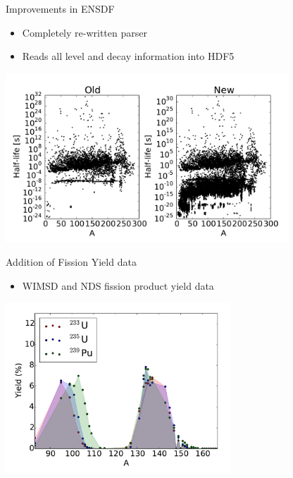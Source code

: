 \documentclass[xcolor=x11names,compress]{beamer}
\renewcommand{\(}{\begin{columns}}
\renewcommand{\)}{\end{columns}}
\newcommand{\<}[1]{\begin{column}{#1}}
\renewcommand{\>}{\end{column}}
\begin{document}
\begin{frame}{Improvements in ENSDF}
    \begin{itemize}
        \item Completely re-written parser
        \item Reads all level and decay information into HDF5
    \end{itemize}
    
        \includegraphics[height=2.5in,clip]{ensdf.pdf}  
   
\end{frame}

\begin{frame}{Addition of Fission Yield data}
    \begin{itemize}
        \item WIMSD and NDS fission product yield data
    \end{itemize}
    \includegraphics[height=2.5in,clip]{yield.pdf}  
\end{frame}
\end{document}
